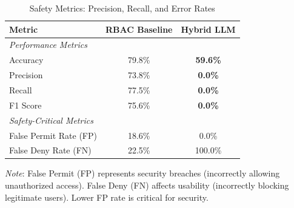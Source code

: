 \begin{table}[h]
    \centering
    \caption{Safety Metrics: Precision, Recall, and Error Rates}
    \label{tab:safety_metrics}
    \begin{tabular}{lcc}
        \toprule
        \textbf{Metric} & \textbf{RBAC Baseline} & \textbf{Hybrid LLM} \\
        \midrule
        \multicolumn{3}{l}{\textit{Performance Metrics}} \\
        Accuracy        & 79.8\% & \textbf{59.6\%} \\
        Precision       & 73.8\% & \textbf{0.0\%} \\
        Recall          & 77.5\% & \textbf{0.0\%} \\
        F1 Score        & 75.6\% & \textbf{0.0\%} \\
        \midrule
        \multicolumn{3}{l}{\textit{Safety-Critical Metrics}} \\
        False Permit Rate (FP)  & 18.6\% & 0.0\% \\
        False Deny Rate (FN)    & 22.5\% & 100.0\% \\
        \bottomrule
    \end{tabular}
\end{table}

\textit{Note}: False Permit (FP) represents security breaches (incorrectly allowing unauthorized access). False Deny (FN) affects usability (incorrectly blocking legitimate users). Lower FP rate is critical for security.
